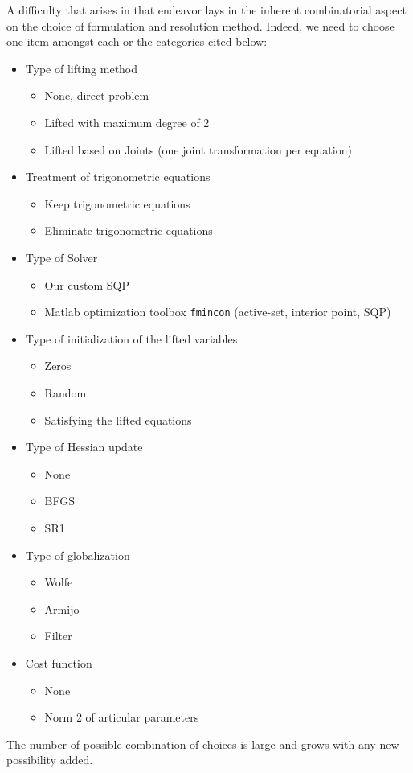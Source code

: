 A difficulty that arises in that endeavor lays in the inherent combinatorial aspect on the choice of formulation and resolution method.
Indeed, we need to choose one item amongst each or the categories cited below:
\begin{itemize}
  \item Type of lifting method
  \begin{itemize}
    \item None, direct problem
    \item Lifted with maximum degree of 2
    \item Lifted based on Joints (one joint transformation per equation)
  \end{itemize}
  \item Treatment of trigonometric equations
  \begin{itemize}
    \item Keep trigonometric equations
    \item Eliminate trigonometric equations
  \end{itemize}
  \item Type of Solver
  \begin{itemize}
    \item Our custom SQP
    \item Matlab optimization toolbox {\tt fmincon} (active-set, interior point, SQP)
  \end{itemize}
  \item Type of initialization of the lifted variables
  \begin{itemize}
    \item Zeros
    \item Random
    \item Satisfying the lifted equations
  \end{itemize}
  \item Type of Hessian update
  \begin{itemize}
    \item None
    \item BFGS
    \item SR1
  \end{itemize}
  \item Type of globalization
  \begin{itemize}
    \item Wolfe
    \item Armijo
    \item Filter
  \end{itemize}
  \item Cost function
  \begin{itemize}
    \item None
    \item Norm 2 of articular parameters
  \end{itemize}
\end{itemize}
The number of possible combination of choices is large and grows with any new possibility added.


